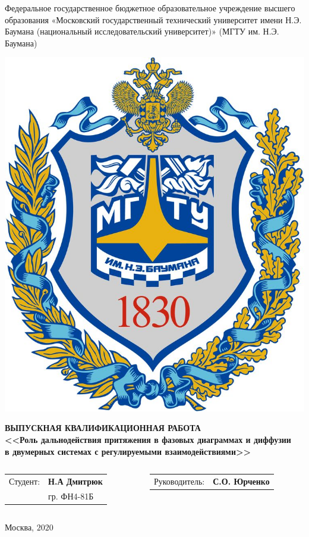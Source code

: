 \documentclass[pdf,hyperref={unicode}]{beamer}
\date{ }
\begin{document}

\begin{frame}
	\begin{center}\tiny
		Федеральное государственное бюджетное образовательное учреждение высшего образования «Московский государственный технический университет имени Н.Э. Баумана (национальный исследовательский университет)» (МГТУ им. Н.Э. Баумана)\\
    \end{center}

	\begin{center}
		\includegraphics[width=0.15\linewidth]{emb}
	\end{center}

	\begin{center}
\tiny \textbf{ВЫПУСКНАЯ КВАЛИФИКАЦИОННАЯ РАБОТА}\\
\tiny \textbf{<<Роль дальнодействия притяжения в фазовых диаграммах и диффузии\\ в двумерных системах с регулируемыми взаимодействиями>>}
\end{center}

	\vspace{0.5cm}
	
	\begin{columns}[T,onlytextwidth]
                \begin{column}{0.50\textwidth}
                        \begin{tabular}{ll}
        \tiny Студент:  & \tiny \textbf{Н.А Дмитрюк}    \\
                   & \tiny гр. ФН4-81Б \\

    \end{tabular}
                \end{column}
                \begin{column}{0.50\textwidth}
                        \begin{tabular}{ll}
        \tiny Руководитель:  & \tiny \textbf{С.О. Юрченко}
                            
    \end{tabular}
                \end{column}
        \end{columns}
        
    
\vfill
\begin{center}
\tiny Москва, $2020$
\end{center}
\end{frame}
\end{document}
